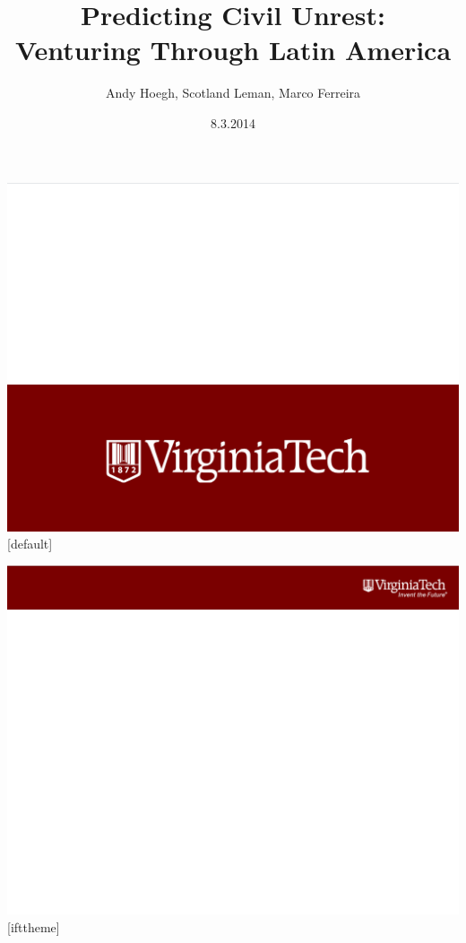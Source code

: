 \documentclass{beamer}
\title{Predicting Civil Unrest: \\Venturing Through Latin America}
\author{Andy Hoegh, Scotland Leman, Marco Ferreira}
\institute{
Department of Statistics, Virginia Tech
}
\date{8.3.2014}
\begin{document}
\newcommand\Fontvi{\fontsize{6}{7.2}\selectfont}

 {\includegraphics[width=\paperwidth,height=\paperheight]{frontpage}}
[default]

\begin{frame}
  \titlepage
  \vspace{5cm}
\end{frame}

%
%
 {\includegraphics[width=\paperwidth,height=\paperheight]{slide_small}}
[ifttheme]
\end{document}
